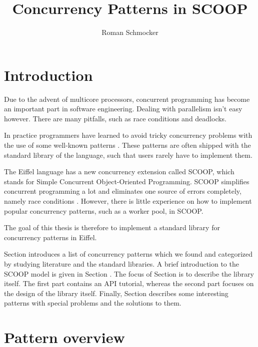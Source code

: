 \documentclass[a4paper,10pt]{article}
\title{Concurrency Patterns in SCOOP}
\author{Roman Schmocker}
\newcommand{\todoref}{\todo{ref}}
\begin{document}
\maketitle

\begin{abstract}

\end{abstract}

\tableofcontents

\section{Introduction}

Due to the advent of multicore processors, concurrent programming has become an important part in software engineering.
Dealing with parallelism isn't easy however.
There are many pitfalls, such as race conditions and deadlocks.

In practice programmers have learned to avoid tricky concurrency problems with the use of some well-known patterns .
These patterns are often shipped with the standard library of the language, such that users rarely have to implement them.

The Eiffel language  has a new concurrency extension called SCOOP, which stands for Simple Concurrent Object-Oriented Programming.
SCOOP simplifies concurrent programming a lot and eliminates one source of errors completely, namely race conditions .
However, there is little experience on how to implement popular concurrency patterns, such as a worker pool, in SCOOP.

The goal of this thesis is therefore to implement a standard library for concurrency patterns in Eiffel.

Section \todoref introduces a list of concurrency patterns which we found and categorized by studying literature and the standard libraries.
A brief introduction to the SCOOP model is given in Section \todoref.
The focus of Section \todoref is to describe the library itself.
The first part contains an API tutorial, whereas the second part focuses on the design of the library itself.
Finally, Section \todoref describes some interesting patterns with special problems and the solutions to them.

\section {Pattern overview}
\label{sec:pattern_overview}
\end{document}
